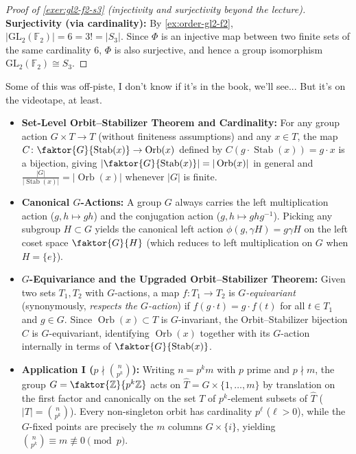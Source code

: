 \begin{content}
\begin{proof}[Proof of \cref{exer:gl2-f2-s3} (injectivity and surjectivity beyond the lecture)]
\textbf{Surjectivity (via cardinality):} By \cref{ex:order-gl2-f2}, $\left|\mathrm{GL}_2(\mathbb{F}_2)\right| = 6 = 3! = |S_3|$. Since $\Phi$ is an injective map between two finite sets of the same cardinality $6$, $\Phi$ is also surjective, and hence a group isomorphism $\mathrm{GL}_2(\mathbb{F}_2) \cong S_3$.
\end{proof}
\end{content}

\begin{speech}[01:29:24 - 01:29:40]
Some of this was off-piste, I don't know if it's in the book, we'll see... But it's on the videotape, at least.
\end{speech}

\begin{overview}
\begin{itemize}
    \item \textbf{Set-Level Orbit--Stabilizer Theorem and Cardinality:} For any group action $G \times T \to T$ (without finiteness assumptions) and any $x \in T$, the map $C \colon \faktor{G}{\operatorname{Stab}(x)} \to \operatorname{Orb}(x)$ defined by $C(g \cdot \operatorname{Stab}(x)) = g \cdot x$ is a bijection, giving $\left|\faktor{G}{\operatorname{Stab}(x)}\right| = |\operatorname{Orb}(x)|$ in general and $\frac{|G|}{|\operatorname{Stab}(x)|} = |\operatorname{Orb}(x)|$ whenever $|G|$ is finite.
    \item \textbf{Canonical $G$-Actions:} A group $G$ always carries the left multiplication action ($g, h \mapsto gh$) and the conjugation action ($g, h \mapsto ghg^{-1}$). Picking any subgroup $H \subset G$ yields the canonical left action $\phi(g, \gamma H) = g\gamma H$ on the left coset space $\faktor{G}{H}$ (which reduces to left multiplication on $G$ when $H = \{e\}$).
    \item \textbf{$G$-Equivariance and the Upgraded Orbit--Stabilizer Theorem:} Given two sets $T_1, T_2$ with $G$-actions, a map $f \colon T_1 \to T_2$ is \emph{$G$-equivariant} (synonymously, \emph{respects the $G$-action}) if $f(g \cdot t) = g \cdot f(t)$ for all $t \in T_1$ and $g \in G$. Since $\operatorname{Orb}(x) \subset T$ is $G$-invariant, the Orbit--Stabilizer bijection $C$ is $G$-equivariant, identifying $\operatorname{Orb}(x)$ together with its $G$-action internally in terms of $\faktor{G}{\operatorname{Stab}(x)}$.
    \item \textbf{Application I ($p \nmid \binom{n}{p^k}$):} Writing $n = p^k m$ with $p$ prime and $p \nmid m$, the group $G = \faktor{\mathbb{Z}}{p^k\mathbb{Z}}$ acts on $\widehat{T} = G \times \{1, \dots, m\}$ by translation on the first factor and canonically on the set $T$ of $p^k$-element subsets of $\widehat{T}$ ($|T| = \binom{n}{p^k}$). Every non-singleton orbit has cardinality $p^\ell$ ($\ell > 0$), while the $G$-fixed points are precisely the $m$ columns $G \times \{i\}$, yielding $\binom{n}{p^k} \equiv m \not\equiv 0 \pmod{p}$.

\end{itemize}
\end{overview}
